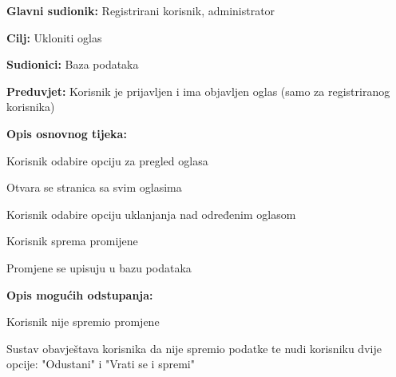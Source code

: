 				\noindent {}
					\begin{packed_item}
	
						\item \textbf{Glavni sudionik: }Registrirani korisnik, administrator
						\item  \textbf{Cilj:} Ukloniti oglas
						\item  \textbf{Sudionici:} Baza podataka
						\item  \textbf{Preduvjet:} Korisnik je prijavljen i ima objavljen oglas (samo za registriranog korisnika)
						\item  \textbf{Opis osnovnog tijeka:}
						
						\item[] \begin{packed_enum}
	
							\item Korisnik odabire opciju za pregled oglasa
							\item Otvara se stranica sa svim oglasima
							\item Korisnik odabire opciju uklanjanja nad određenim oglasom					
							\item Korisnik sprema promijene
							\item Promjene se upisuju u bazu podataka

						\end{packed_enum}		
						
						\item  \textbf{Opis mogućih odstupanja:}
						
						\item[] \begin{packed_item}
	
							\item[5.a] Korisnik nije spremio promjene
								\begin{packed_item}
									\item Sustav obavještava korisnika da nije spremio podatke te nudi korisniku dvije opcije: "Odustani" i "Vrati se i spremi"
								\end{packed_item}
								
						\end{packed_item}				
					\end{packed_item}
					
